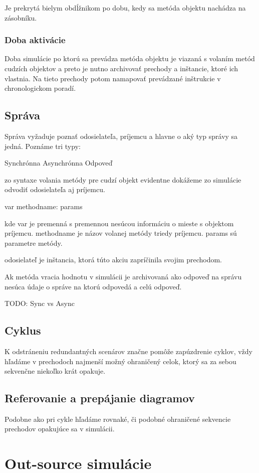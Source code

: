 Je prekrytá bielym obdĺžnikom po dobu, kedy sa metóda objektu nachádza na zásobníku.

\subsubsection*{Doba aktivácie}
Doba simulácie po ktorú sa prevádza metóda objektu je viazaná s volaním metód cudzích objektov a preto je nutno archivovať prechody a inštancie, ktoré ich vlastnia. Na tieto prechody potom namapovať prevádzané inštrukcie v chronologickom poradí.

\subsection*{Správa}
Správa vyžaduje poznať odosielateľa, príjemcu a hlavne o aký typ správy sa jedná. Poznáme tri typy:

Synchrónna
Asynchrónna
Odpoveď

zo syntaxe volania metódy pre cudzí objekt evidentne dokážeme zo simulácie odvodiť odosielateľa aj príjemcu.

var methodname: params

kde var je premenná s premennou nesúcou informáciu o mieste s objektom príjemcu. methodname je názov volanej metódy triedy príjemcu. params sú parametre metódy.

odosielateľ je inštancia, ktorá túto akciu zapríčinila svojim prechodom.

Ak metóda vracia hodnotu v simulácii je archivovaná ako odpoveď na správu nesúca údaje o správe na ktorú odpovedá a celú odpoveď.

TODO: Sync vs Async

\subsection*{Cyklus}

K odstráneniu redundantných scenárov značne pomôže zapúzdrenie cyklov, vždy hľadáme v prechodoch najmenší možný ohraničený celok, ktorý sa za sebou sekvenčne niekoľko krát opakuje.

\subsection*{Referovanie a prepájanie diagramov}
Podobne ako pri cykle hľadáme rovnaké, či podobné ohraničené sekvencie prechodov opakujúce sa v simulácii.

\section{Out-source simulácie}


